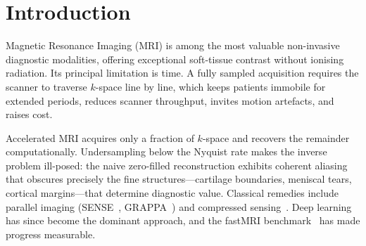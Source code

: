 \documentclass[11pt]{article}
\begin{document}
\begin{abstract}
In a controlled ablation on synthetic phantom data, the data-consistency
cascade beats a capacity-matched single-pass network by \SI{2.40}{\decibel}
on a U-Net backbone and \SI{2.16}{\decibel} on a SwinUNet backbone, both at
$p < 10^{-4}$ under a paired permutation test and both with fewer parameters
than the control. The near-equality of the two gains across architectures with
very different inductive biases indicates the improvement comes from the
physics constraint rather than the network. A secondary finding is that
complex-valued input on its own \emph{costs} \SI{2.14}{\decibel}, because the
magnitude loss leaves phase unsupervised --- which is precisely the freedom the
data-consistency projection removes. I do not restate the previously reported
fastMRI figures as validated results: they are not reproducible from the v1 release, and the corrections to the sampling and metric definitions
mean that numbers produced under the old protocol are not comparable to numbers
produced under the new one. The revised system, its 267-test suite, and a
synthetic data generator that makes the full pipeline runnable without the
fastMRI download are released so that the benchmark numbers can be regenerated
under a protocol that is stated precisely and checked automatically.
\end{abstract}

\tableofcontents
\newpage

\section{Introduction}

Magnetic Resonance Imaging (MRI) is among the most valuable non-invasive
diagnostic modalities, offering exceptional soft-tissue contrast without
ionising radiation. Its principal limitation is time. A fully sampled
acquisition requires the scanner to traverse $k$-space line by line, which keeps
patients immobile for extended periods, reduces scanner throughput, invites
motion artefacts, and raises cost.

Accelerated MRI acquires only a fraction of $k$-space and recovers the remainder
computationally. Undersampling below the Nyquist rate makes the inverse problem
ill-posed: the naive zero-filled reconstruction exhibits coherent aliasing that
obscures precisely the fine structures---cartilage boundaries, meniscal tears,
cortical margins---that determine diagnostic value. Classical remedies include
parallel imaging (SENSE~\cite{pruessmann1999}, GRAPPA~\cite{griswold2002}) and
compressed sensing~\cite{lustig2007}. Deep learning has since become the
dominant approach, and the fastMRI benchmark~\cite{zbontar2018} has made
progress measurable.
\end{document}
